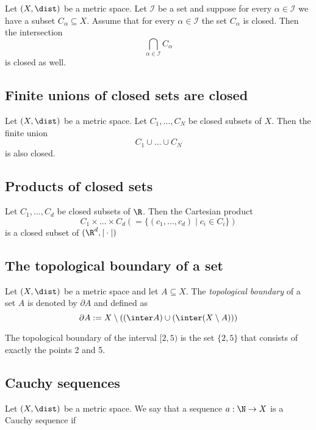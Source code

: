 \begin{proposition}
    Let $(X, \dist)$ be a metric space. Let $\mathcal{I}$ be a set and suppose for every $\alpha \in \mathcal{I}$ we have a subset $C_\alpha \subseteq X$.
    Assume that for every $\alpha \in \mathcal{I}$ the set $C_\alpha$ is closed. Then the intersection
    $$\bigcap_{\alpha\in\mathcal{I}}C_\alpha$$
    is closed as well.
\end{proposition}

\subsection*{Finite unions of closed sets are closed}
\begin{proposition}
    Let $(X, \dist)$ be a metric space. Let $C_1, \dots, C_N$ be closed subsets of $X$. Then the finite union
    $$C_1 \cup \dots \cup C_N$$
    is also closed.
\end{proposition}

\subsection*{Products of closed sets}
\begin{proposition}
    Let $C_1,\dots,C_d$ be closed subsets of $\R$. Then
    the Cartesian product
    $$C_1 \times \dots \times C_d (=\{(c_1,\dots,c_d) \mid c_i \in C_i\})$$
    is a closed subset of $(\R^d, |\cdot|)$
\end{proposition}

\subsection*{The topological boundary of a set}
\begin{definition}
    Let $(X, \dist)$ be a metric space and let $A \subseteq X$. The \emph{topological boundary} of a set $A$ is denoted by
    $\partial A$ and defined as
    $$\partial A := X \setminus ((\inter A)\cup(\inter (X \setminus A)))$$
\end{definition}

\begin{example}
    The topological boundary of the interval $[2,5)$ is the set $\{2,5\}$ that consists of exactly the points 2 and 5.
\end{example}

\subsection{Cauchy sequences}
\begin{definition}
    Let $(X, \dist)$ be a metric space. We say that a sequence $a: \N \to X$ is a Cauchy sequence if
    \begin{myCenter}
    \end{myCenter}
\end{definition}

